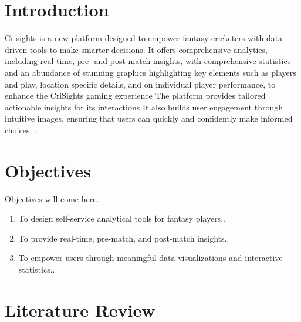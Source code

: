     
\section{Introduction}

Crisights is a new platform designed to empower fantasy cricketers with data-driven tools to make smarter decisions.
 It offers comprehensive analytics, including real-time, pre- and post-match insights, with comprehensive statistics
  and an abundance of stunning graphics highlighting key elements such as players and play, location specific details,
   and on individual player performance, to enhance the CriSights gaming experience The platform provides tailored actionable 
   insights for its interactions It also builds user engagement through intuitive images, ensuring that users can quickly and 
   confidently make informed choices.
 \cite{greenwade93}.


\section{Objectives}
Objectives will come here.
\begin{enumerate}
	\item To design self-service analytical tools for fantasy players..
	
	\item To provide real-time, pre-match, and post-match insights.. 
	
    \item To empower users through meaningful data visualizations and interactive statistics..
\end{enumerate}

\section{Literature Review}
